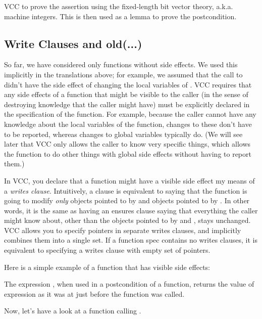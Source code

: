 \noindent
VCC to prove the assertion using the fixed-length bit vector theory, a.k.a. machine integers.
This is then used as a lemma to prove the postcondition.


\subsection{Write Clauses and old(...)}
So far, we have considered only functions without side effects. We
used this implicitly in the translations above; for example, we assumed
that the call to  didn't have the side effect of changing
the local variables of . VCC requires that any side
effects of a function that might be visible to the caller (in the
sense of destroying knowledge that the caller might have) must be explicitly
declared in the specification of the function. For example, because
the caller cannot have any knowledge about the local variables of the
function, changes to these don't have to be reported, whereas changes
to global variables typically do. (We will see later that
VCC only allows the caller to know very specific things, which allows
the function to do other things with global side effects without
having to report them.)

In VCC, you declare that a function might have a visible side effect
my means of a \emph{writes clause}. 
Intuitively, a clause  is equivalent to saying
that the function is going to modify \emph{only} objects pointed to by 
and objects pointed to by .
In other words, it is the same as having an ensures clause
saying that everything the caller might know about, other than the objects
pointed to by  and , stays unchanged. VCC allows you
to specify pointers in separate writes clauses, and implicitly
combines them into a single set. If a function spec contains no writes clauses, 
it is equivalent to specifying a writes clause with empty set of pointers.

Here is a simple example of a function that has visible side effects:

\noindent
The expression , when used in a postcondition of a function,
returns the value of expression 
as it was at just before the function was called. 

Now, let's have a look at a function calling .


